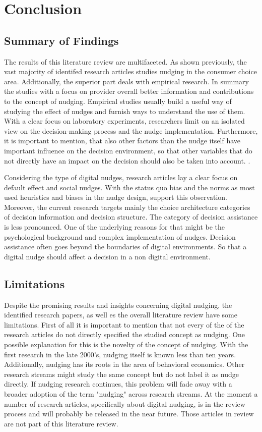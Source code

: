 \section{Conclusion}

 \subsection{Summary of Findings}
The results of this literature review are multifaceted. As shown previously, the vast majority of identifed research articles studies nudging in the consumer choice area. Additionally, the superior part deals with empirical research. In summary the studies with a focus on provider overall better information and contributions to the concept of nudging. Empirical studies usually build a useful way of studying the effect of nudges and furnish ways to understand the use of them. With a clear focus on laboratory experiments, researchers limit on an isolated view on the decision-making process and the nudge implementation. Furthermore, it is important to mention, that also other factors than the nudge itself have important influence on the decision environment, so that other variables that do not directly have an impact on the decision should also be taken into account. \cite{dong_cueing_2019}.

Considering the type of digital nudges, research articles lay a clear focus on default effect and social nudges. With the status quo bias and the norms as most used heuristics and biases in the nudge design, support this observation. Moreover, the current research targets mainly the choice architecture categories of decision information and decision structure. The category of decision assistance is less pronounced. One of the underlying reasons for that might be the psychological background and complex implementation of nudges. Decision assistance often goes beyond the boundaries of digital environments. So that a digital nudge should affect a decision in a non digital environment. 
 
 \subsection{Limitations}
Despite the promising results and insights concerning digital nudging, the identified research papers, as well es the overall literature review have some limitations.
First of all it is important to mention that not every of the of the research articles do not directly  specified the studied concept as nudging. One possible explanation for this is the novelty of the concept of nudging. With the first research in the late 2000's, nudging itself is known less than ten years. Additionally, nudging has its roots in the area of behavioral economics. Other research streams might study the same concept but do not label it as nudge directly. If nudging research continues, this problem will fade away with a broader adoption of the term "nudging" across research streams. At the moment a number of research articles, specifically about digital nudging, is in the review process and will probably be released in the near future. Those articles in review are not part of this literature review. 

